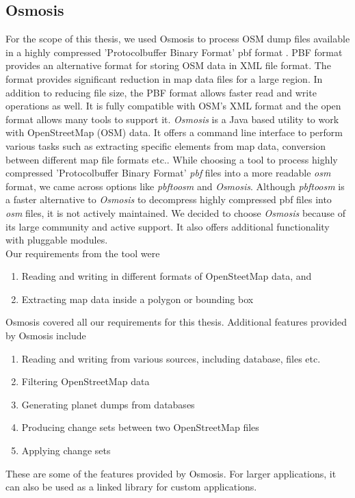 \subsection{Osmosis} \label{osmosis}
For the scope of this thesis, we used Osmosis to process OSM dump files available in a highly compressed 'Protocolbuffer Binary Format' pbf format \cite{osmpbf}. PBF format provides an alternative format for storing OSM data in XML file format. The format provides significant reduction in map data files for a large region. In addition to reducing file size, the PBF format allows faster read and write operations as well. It is fully compatible with OSM's XML format and the open format allows many tools to support it. \textit{Osmosis} \cite{osmosis} is a Java based utility to work with OpenStreetMap (OSM) data. It offers a command line interface to perform various tasks such as extracting specific elements from map data, conversion between different map file formats etc.. While choosing a tool to process highly compressed 'Protocolbuffer Binary Format' \textit{pbf} files into a more readable \textit{osm} format, we came across options like \textit{pbftoosm} \cite{pbftoosm} and \textit{Osmosis}. Although \textit{pbftoosm} is a faster alternative \cite{pbftoosm} to \textit{Osmosis} to decompress highly compressed pbf files into \textit{osm} files, it is not actively maintained. We decided to choose \textit{Osmosis} because of its large community and active support.  It also offers additional functionality with pluggable modules. \\

Our requirements from the tool were
\begin{enumerate}
\item Reading and writing in different formats of OpenSteetMap data, and
\item Extracting map data inside a polygon or bounding box
\end{enumerate}
Osmosis covered all our requirements for this thesis. Additional features provided by Osmosis include \begin{enumerate}
\item Reading and writing from various sources, including database, files etc.
\item Filtering OpenStreetMap data
\item Generating planet dumps from databases
\item Producing change sets between two OpenStreetMap files
\item Applying change sets 
\end{enumerate} 
These are some of the features provided by Osmosis. For larger applications, it can also be used as a linked library for custom applications.\\ 

